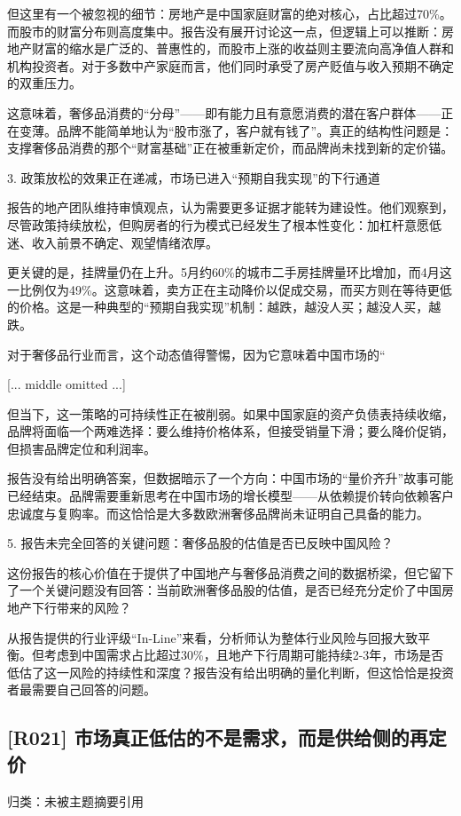 \documentclass[11pt]{ctexart}
\begin{document}
但这里有一个被忽视的细节：房地产是中国家庭财富的绝对核心，占比超过70\%。而股市的财富分布则高度集中。报告没有展开讨论这一点，但逻辑上可以推断：房地产财富的缩水是广泛的、普惠性的，而股市上涨的收益则主要流向高净值人群和机构投资者。对于多数中产家庭而言，他们同时承受了房产贬值与收入预期不确定的双重压力。

这意味着，奢侈品消费的“分母”——即有能力且有意愿消费的潜在客户群体——正在变薄。品牌不能简单地认为“股市涨了，客户就有钱了”。真正的结构性问题是：支撑奢侈品消费的那个“财富基础”正在被重新定价，而品牌尚未找到新的定价锚。

3. 政策放松的效果正在递减，市场已进入“预期自我实现”的下行通道

报告的地产团队维持审慎观点，认为需要更多证据才能转为建设性。他们观察到，尽管政策持续放松，但购房者的行为模式已经发生了根本性变化：加杠杆意愿低迷、收入前景不确定、观望情绪浓厚。

更关键的是，挂牌量仍在上升。5月约60\%的城市二手房挂牌量环比增加，而4月这一比例仅为49\%。这意味着，卖方正在主动降价以促成交易，而买方则在等待更低的价格。这是一种典型的“预期自我实现”机制：越跌，越没人买；越没人买，越跌。

对于奢侈品行业而言，这个动态值得警惕，因为它意味着中国市场的“

[... middle omitted ...]


但当下，这一策略的可持续性正在被削弱。如果中国家庭的资产负债表持续收缩，品牌将面临一个两难选择：要么维持价格体系，但接受销量下滑；要么降价促销，但损害品牌定位和利润率。

报告没有给出明确答案，但数据暗示了一个方向：中国市场的“量价齐升”故事可能已经结束。品牌需要重新思考在中国市场的增长模型——从依赖提价转向依赖客户忠诚度与复购率。而这恰恰是大多数欧洲奢侈品牌尚未证明自己具备的能力。

5. 报告未完全回答的关键问题：奢侈品股的估值是否已反映中国风险？

这份报告的核心价值在于提供了中国地产与奢侈品消费之间的数据桥梁，但它留下了一个关键问题没有回答：当前欧洲奢侈品股的估值，是否已经充分定价了中国房地产下行带来的风险？

从报告提供的行业评级“In-Line”来看，分析师认为整体行业风险与回报大致平衡。但考虑到中国需求占比超过30\%，且地产下行周期可能持续2-3年，市场是否低估了这一风险的持续性和深度？报告没有给出明确的量化判断，但这恰恰是投资者最需要自己回答的问题。

\subsection{[R021] 市场真正低估的不是需求，而是供给侧的再定价}
{\small\color{refgray}归类：未被主题摘要引用}
\end{document}
